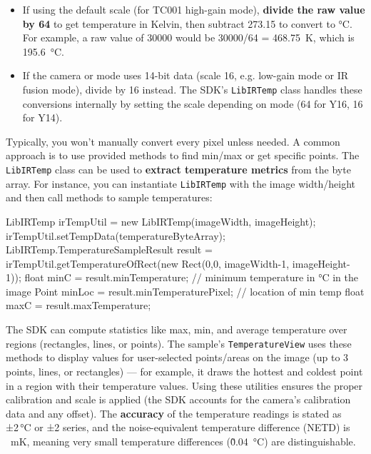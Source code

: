 {\begin{itemize}
\item If using the default scale (for TC001 high-gain mode), \textbf{divide the
  raw value by 64} to get temperature in Kelvin, then subtract 273.15
  to convert to °C. For example, a raw value of 30000 would be 30000/64
  = 468.75 K, which is 195.6 °C.
\item If the camera or mode uses 14-bit data (scale 16, e.g. low-gain mode
  or IR fusion mode), divide by 16
  instead\cite{InstantStressSmartphone2019}.
  The SDK's \texttt{LibIRTemp} class handles these conversions internally by
  setting the scale depending on mode (64 for Y16, 16 for
  Y14)\cite{InstantStressSmartphone2019}.

\end{itemize}
Typically, you won't manually convert every pixel unless needed. A
common approach is to use provided methods to find min/max or get
specific points. The \texttt{LibIRTemp} class can be used to \textbf{extract
temperature metrics} from the byte array. For instance, you can
instantiate \texttt{LibIRTemp} with the image width/height and then call
methods to sample temperatures:

    LibIRTemp irTempUtil = new LibIRTemp(imageWidth, imageHeight);
    irTempUtil.setTempData(temperatureByteArray);
    LibIRTemp.TemperatureSampleResult result = irTempUtil.getTemperatureOfRect(new Rect(0,0, imageWidth-1, imageHeight-1));
    float minC = result.minTemperature;  // minimum temperature in °C in the image
    Point minLoc = result.minTemperaturePixel;  // location of min temp
    float maxC = result.maxTemperature;

The SDK can compute statistics like max, min, and average temperature
over regions (rectangles, lines, or
points)\cite{InstantStressSmartphone2019}\cite{GSRPPGMachineLearning2024}.
The sample's \texttt{TemperatureView} uses these methods to display values for
user-selected points/areas on the image (up to 3 points, lines, or
rectangles) --- for example, it draws the hottest and coldest point in a
region with their temperature
values\cite{GSRPPGMachineLearning2024}\cite{GSRPPGMachineLearning2024}.
Using these utilities ensures the proper calibration and scale is
applied (the SDK accounts for the camera's calibration data and any
offset). The \textbf{accuracy} of the temperature readings is stated as ±2 °C
or ±2%
series\cite{TopdonTC001}\cite{DeviceServer},
and the noise-equivalent temperature difference (NETD) is  mK,
meaning very small temperature differences (\~0.04 °C) are
distinguishable\cite{AppleHealthWatch2019}.

}
